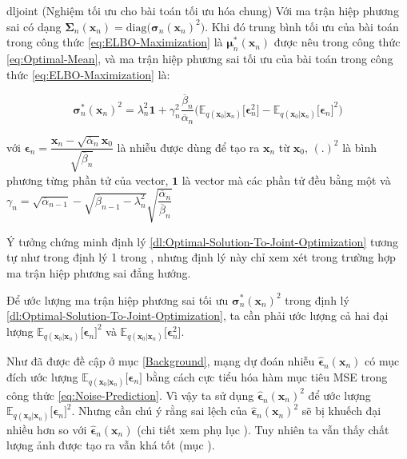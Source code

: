 \documentclass[14pt, a4paper]{article}
\numberwithin{equation}{section}
\numberwithin{figure}{section}
\numberwithin{dl}{section}
\numberwithin{md}{section}
\numberwithin{bd}{section}
\numberwithin{dn}{section}
\numberwithin{hq}{section}
\begin{document}
    \begin{restatable}{dl}{joint} \label{dl:Optimal-Solution-To-Joint-Optimization}
        (Nghiệm tối ưu cho bài toán tối ưu hóa chung) 
        Với ma trận hiệp phương sai có dạng $\boldsymbol{\Sigma}_n (\boldsymbol{x}_n)=\mathrm{diag}\big( \boldsymbol{\sigma}_n (\boldsymbol{x}_n)^2 \big)$.
        Khi đó trung bình tối ưu của bài toán trong công thức \ref{eq:ELBO-Maximization} là $\boldsymbol{\mu}_n^{\ast} (\boldsymbol{x}_n)$ được nêu trong công thức \ref{eq:Optimal-Mean},
        và ma trận hiệp phương sai tối ưu của bài toán trong công thức \ref{eq:ELBO-Maximization} là:


        \begin{equation*}
            \boldsymbol{\sigma}_n^{\ast} (\boldsymbol{x}_n)^2 = \lambda_n^2 \boldsymbol{1} + \gamma_n^2 \dfrac{\overline{\beta}_n}{\overline{\alpha}_n} \big( \mathbb{E}_{q(\boldsymbol{x}_0 \vert \boldsymbol{x}_n)} \lbrack \boldsymbol{\epsilon}_n^2 \rbrack - \mathbb{E}_{q(\boldsymbol{x}_0 \vert \boldsymbol{x}_n)} \lbrack \boldsymbol{\epsilon}_n \rbrack^2 \big)
        \end{equation*}

        với $\boldsymbol{\epsilon}_n = \dfrac{\boldsymbol{x}_n - \sqrt{\overline{\alpha}_n} \boldsymbol{x}_0}{\sqrt{\overline{\beta}_n}}$ là nhiễu được dùng để tạo ra $\boldsymbol{x}_n$ từ $\boldsymbol{x}_0$,
        $(.)^2$ là bình phương từng phần tử của vector, $\boldsymbol{1}$ là vector mà các phần tử đều bằng một và $\gamma_n = \sqrt{\overline{\alpha}_{n-1}} - \sqrt{\overline{\beta}_{n-1} - \lambda_n^2} \sqrt{\dfrac{\overline{\alpha}_n}{\overline{\beta}_n}}$
    \end{restatable}

    Ý tưởng chứng minh định lý \ref{dl:Optimal-Solution-To-Joint-Optimization} tương tự như trong định lý 1 trong \cite{bao2021analytic}, nhưng định lý này chỉ xem xét trong trường hợp ma trận hiệp phương sai đẳng hướng.

    Để ước lượng ma trận hiệp phương sai tối ưu $\boldsymbol{\sigma}_n^{\ast} (\boldsymbol{x}_n)^2$ trong định lý \ref{dl:Optimal-Solution-To-Joint-Optimization}, ta cần phải ước lượng cả hai đại lượng $\mathbb{E}_{q(\boldsymbol{x}_0 \vert \boldsymbol{x}_n)} \lbrack \boldsymbol{\epsilon}_n \rbrack^2$ và $\mathbb{E}_{q(\boldsymbol{x}_0 \vert \boldsymbol{x}_n)} \lbrack \boldsymbol{\epsilon}_n^2 \rbrack$.

    Như đã được đề cập ở mục \ref{Background}, mạng dự đoán nhiễu $\hat{\boldsymbol{\epsilon}}_n (\boldsymbol{x}_n)$ có mục đích ước lượng $\mathbb{E}_{q(\boldsymbol{x}_0 \vert \boldsymbol{x}_n)} \lbrack \boldsymbol{\epsilon}_n \rbrack$ bằng cách cực tiểu hóa hàm mục tiêu MSE trong công thức \ref{eq:Noise-Prediction}.
    Vì vậy ta sử dụng $\hat{\boldsymbol{\epsilon}}_n (\boldsymbol{x}_n)^2$ để ước lượng $\mathbb{E}_{q(\boldsymbol{x}_0 \vert \boldsymbol{x}_n)} \lbrack \boldsymbol{\epsilon}_n \rbrack^2$.
    Nhưng cần chú ý rằng sai lệch của $\hat{\boldsymbol{\epsilon}}_n (\boldsymbol{x}_n)^2$ sẽ bị khuếch đại nhiều hơn so với $\hat{\boldsymbol{\epsilon}}_n (\boldsymbol{x}_n)$ (chi tiết xem phụ lục ).
    Tuy nhiên ta vẫn thấy chất lượng ảnh được tạo ra vẫn khá tốt (mục ).
\end{document}
